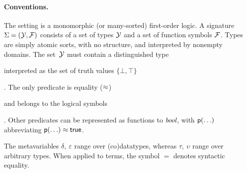 %

\paragraph{Conventions.}
The setting is a monomorphic (or many-sorted) first-order logic.
A signature $\mathrm{\Sigma} = (\mathcal{Y}, \mathcal{F})$ consists of a set of types $\mathcal{Y}$ and a
set of function symbols $\mathcal{F}$. Types are simply atomic sorts, with no
structure, and interpreted by nonempty domains. The set~$\mathcal{Y}$ must contain a
distinguished type \begin{report} interpreted as the set of truth
values $\{\bot, \top\}$\end{report}. %
The only predicate is equality ($\approx$)\begin{report} and belongs to the logical symbols\end{report}.
Other predicates can be represented as functions to $\textit{bool}$,
with $\textsf{p}(\ldots)$ abbreviating $\textsf{p}(\ldots) \approx \textsf{true}$.
\begin{report}
The metavariables $\delta,\:\varepsilon$ range over (co)datatypes,
whereas $\tau,\:\upsilon$ range over arbitrary types.
When applied to terms, the symbol $=$ denotes syntactic equality.\end{report}


